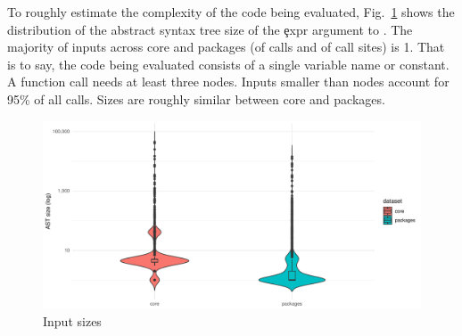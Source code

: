 \documentclass[conference]{IEEEtran}
\begin{document}
\begin{table}[ht] \label{table:site-package-summary}
\caption{Distribution of callsites in CRAN}
\end{table}


To roughly estimate the complexity of the code being evaluated,
Fig.~\ref{fig:ast-size} shows the distribution of the abstract syntax tree
size of the \c{expr} argument to \eval. The majority of inputs across core
and packages (\NbAstOnePercent of \eval calls and \NbAstOneCallSitePercent of call sites) is 1. That is to say, the code being evaluated
consists of a single variable name or constant. A function call needs at
least three nodes. Inputs smaller than \AstSizeNineFive nodes account for 95\% of all
calls. Sizes are roughly similar between core and packages.

\begin{figure}[htbp]
\includegraphics[width=\columnwidth]{ast_sizes}
\caption{Input sizes} \label{fig:ast-size}
\end{figure}
\end{document}
